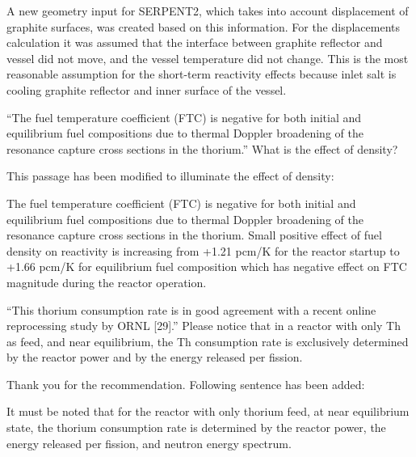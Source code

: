 \documentclass[answers,11pt]{exam}
\begin{document}
\begin{questions}
\begin{solution}
                A new geometry input for SERPENT2, which takes into account 
                displacement of graphite surfaces, was created based on this information.
                 For the displacements calculation it was assumed that the interface 
                 between graphite reflector and vessel did not move, and the vessel 
                 temperature did not change. This is the most reasonable assumption for
				 the short-term reactivity effects because inlet salt is cooling graphite 
				 reflector and inner surface of the vessel.
        \end{solution}


        \question ``The fuel temperature coefficient (FTC) is negative for both 
        initial and equilibrium fuel compositions due to thermal Doppler 
        broadening of the resonance capture cross sections in the thorium.'' 
        What is the effect of density?
        \begin{solution}
                This passage has been modified to illuminate the effect of density:
                
				The fuel temperature coefficient (FTC) is negative for both initial and 
				equilibrium fuel compositions due to thermal Doppler broadening of the 
				resonance capture cross sections in the thorium. Small positive effect 
				of fuel density on reactivity is increasing from +1.21 pcm/K for the 
				reactor startup to +1.66 pcm/K for equilibrium fuel composition which 
				has negative effect on FTC magnitude during the reactor operation. 
        \end{solution}


        \question ``This thorium consumption rate is in good agreement with a 
        recent online reprocessing study by ORNL [29].'' Please notice that in a 
        reactor with only Th as feed, and near equilibrium, the Th consumption 
        rate is  exclusively determined by the reactor power and by the energy 
        released per fission.  
        \begin{solution}
                Thank you for the recommendation. Following sentence has been 
                added:
                
                It must be noted that for the reactor with only thorium feed, 
                at near equilibrium state, the thorium consumption rate is 
				determined by the reactor power, the energy released per fission, 
				and neutron energy spectrum.
        \end{solution}


\end{questions}
\end{document}
